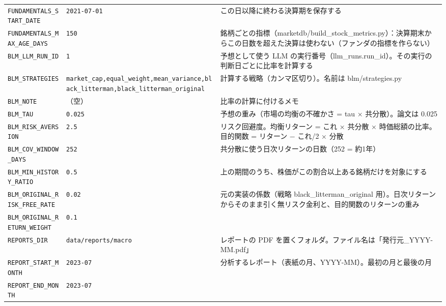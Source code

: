 \documentclass[xelatex,ja=standard,jafont=hiragino-pron,a4paper,10pt]{bxjsreport}
\begin{document}
{\begin{longtable}{p{4.60cm}p{3.60cm}p{6.20cm}}
\texttt{FUNDAMENTALS\_\allowbreak{}START\_\allowbreak{}DATE} & \texttt{2021-07-01} & この日以降に終わる決算期を保存する \\
\texttt{FUNDAMENTALS\_\allowbreak{}MAX\_\allowbreak{}AGE\_\allowbreak{}DAYS} & \texttt{150} & 銘柄ごとの指標（marketdb/build\_stock\_metrics.py）：決算期末からこの日数を超えた決算は使わない（ファンダの指標を作らない） \\
\texttt{BLM\_\allowbreak{}LLM\_\allowbreak{}RUN\_\allowbreak{}ID} & \texttt{1} & 予想として使う LLM の実行番号（llm\_runs.run\_id）。その実行の判断日ごとに比率を計算する \\
\texttt{BLM\_\allowbreak{}STRATEGIES} & \texttt{market\_\allowbreak{}cap,equal\_\allowbreak{}weight,mean\_\allowbreak{}variance,black\_\allowbreak{}litterman,black\_\allowbreak{}litterman\_\allowbreak{}original} & 計算する戦略（カンマ区切り）。名前は blm/strategies.py \\
\texttt{BLM\_\allowbreak{}NOTE} & （空） & 比率の計算に付けるメモ \\
\texttt{BLM\_\allowbreak{}TAU} & \texttt{0.025} & 予想の重み（市場の均衡の不確かさ = tau × 共分散）。論文は 0.025 \\
\texttt{BLM\_\allowbreak{}RISK\_\allowbreak{}AVERSION} & \texttt{2.5} & リスク回避度。均衡リターン = これ × 共分散 × 時価総額の比率。目的関数 = リターン − これ/2 × 分散 \\
\texttt{BLM\_\allowbreak{}COV\_\allowbreak{}WINDOW\_\allowbreak{}DAYS} & \texttt{252} & 共分散に使う日次リターンの日数（252 = 約1年） \\
\texttt{BLM\_\allowbreak{}MIN\_\allowbreak{}HISTORY\_\allowbreak{}RATIO} & \texttt{0.5} & 上の期間のうち、株価がこの割合以上ある銘柄だけを対象にする \\
\texttt{BLM\_\allowbreak{}ORIGINAL\_\allowbreak{}RISK\_\allowbreak{}FREE\_\allowbreak{}RATE} & \texttt{0.02} & 元の実装の係数（戦略 black\_litterman\_original 用）。日次リターンからそのまま引く無リスク金利と、目的関数のリターンの重み \\
\texttt{BLM\_\allowbreak{}ORIGINAL\_\allowbreak{}RETURN\_\allowbreak{}WEIGHT} & \texttt{0.1} &  \\
\texttt{REPORTS\_\allowbreak{}DIR} & \texttt{data/reports/macro} & レポートの PDF を置くフォルダ。ファイル名は「発行元\_YYYY-MM.pdf」 \\
\texttt{REPORT\_\allowbreak{}START\_\allowbreak{}MONTH} & \texttt{2023-07} & 分析するレポート（表紙の月、YYYY-MM）。最初の月と最後の月 \\
\texttt{REPORT\_\allowbreak{}END\_\allowbreak{}MONTH} & \texttt{2023-07} &  \\

\end{longtable}}
\end{document}
